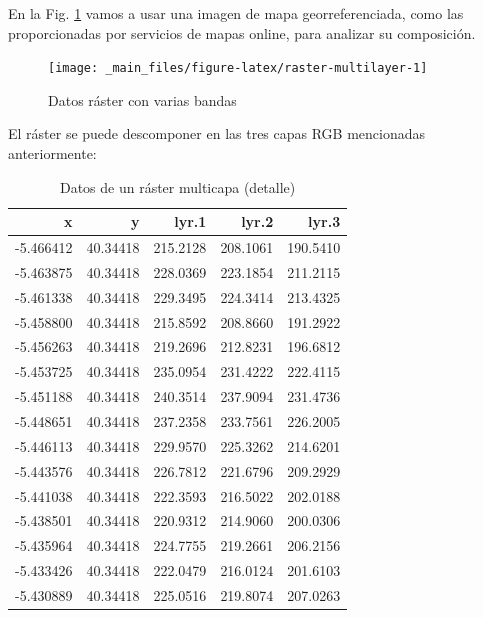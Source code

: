 \documentclass[
]{report}
\begin{document}
En la Fig. \ref{fig:raster-multilayer} vamos a usar una imagen de mapa
georreferenciada, como las proporcionadas por servicios de mapas online, para
analizar su composición.

\begin{figure}

{\centering \texttt{[image: \_main\_files/figure-latex/raster-multilayer-1]} 

}

\caption{Datos ráster con varias bandas}\label{fig:raster-multilayer}
\end{figure}

El ráster se puede descomponer en las tres capas RGB mencionadas anteriormente:

\begin{table}

\caption{\label{tab:detalle-pixel-multicapa}Datos de un ráster multicapa (detalle)}
\centering
\begin{tabular}[t]{r|r|r|r|r}
\hline
x & y & lyr.1 & lyr.2 & lyr.3\\
\hline
-5.466412 & 40.34418 & 215.2128 & 208.1061 & 190.5410\\
\hline
-5.463875 & 40.34418 & 228.0369 & 223.1854 & 211.2115\\
\hline
-5.461338 & 40.34418 & 229.3495 & 224.3414 & 213.4325\\
\hline
-5.458800 & 40.34418 & 215.8592 & 208.8660 & 191.2922\\
\hline
-5.456263 & 40.34418 & 219.2696 & 212.8231 & 196.6812\\
\hline
-5.453725 & 40.34418 & 235.0954 & 231.4222 & 222.4115\\
\hline
-5.451188 & 40.34418 & 240.3514 & 237.9094 & 231.4736\\
\hline
-5.448651 & 40.34418 & 237.2358 & 233.7561 & 226.2005\\
\hline
-5.446113 & 40.34418 & 229.9570 & 225.3262 & 214.6201\\
\hline
-5.443576 & 40.34418 & 226.7812 & 221.6796 & 209.2929\\
\hline
-5.441038 & 40.34418 & 222.3593 & 216.5022 & 202.0188\\
\hline
-5.438501 & 40.34418 & 220.9312 & 214.9060 & 200.0306\\
\hline
-5.435964 & 40.34418 & 224.7755 & 219.2661 & 206.2156\\
\hline
-5.433426 & 40.34418 & 222.0479 & 216.0124 & 201.6103\\
\hline
-5.430889 & 40.34418 & 225.0516 & 219.8074 & 207.0263\\
\hline
\end{tabular}
\end{table}
\end{document}
